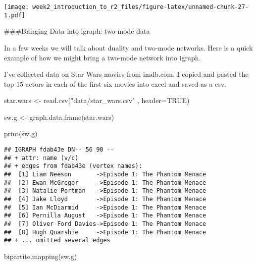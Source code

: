 \documentclass[
]{article}
\newenvironment{Shaded}{\begin{snugshade}}{\end{snugshade}}
\newcommand{\AttributeTok}[1]{\textcolor[rgb]{0.77,0.63,0.00}{#1}}
\newcommand{\ConstantTok}[1]{\textcolor[rgb]{0.00,0.00,0.00}{#1}}
\newcommand{\DecValTok}[1]{\textcolor[rgb]{0.00,0.00,0.81}{#1}}
\newcommand{\FunctionTok}[1]{\textcolor[rgb]{0.00,0.00,0.00}{#1}}
\newcommand{\NormalTok}[1]{#1}
\newcommand{\OtherTok}[1]{\textcolor[rgb]{0.56,0.35,0.01}{#1}}
\newcommand{\SpecialCharTok}[1]{\textcolor[rgb]{0.00,0.00,0.00}{#1}}
\newcommand{\StringTok}[1]{\textcolor[rgb]{0.31,0.60,0.02}{#1}}
\begin{document}
\begin{Shaded}
\end{Shaded}

\texttt{[image: week2\_introduction\_to\_r2\_files/figure-latex/unnamed-chunk-27-1.pdf]}

\#\#\#Bringing Data into igraph: two-mode data

In a few weeks we will talk about duality and two-mode networks. Here is
a quick example of how we might bring a two-mode network into igraph.

I've collected data on Star Wars movies from imdb.com. I copied and
pasted the top 15 actors in each of the first six movies into excel and
saved as a csv.

\begin{Shaded}
\begin{Highlighting}[]
\NormalTok{star.wars }\OtherTok{\textless{}{-}} \FunctionTok{read.csv}\NormalTok{(}\StringTok{"data/star\_wars.csv"}\NormalTok{ , }\AttributeTok{header=}\ConstantTok{TRUE}\NormalTok{)}

\NormalTok{sw.g }\OtherTok{\textless{}{-}} \FunctionTok{graph.data.frame}\NormalTok{(star.wars)}

\FunctionTok{print}\NormalTok{(sw.g)}
\end{Highlighting}
\end{Shaded}

\begin{verbatim}
## IGRAPH fdab43e DN-- 56 90 -- 
## + attr: name (v/c)
## + edges from fdab43e (vertex names):
##  [1] Liam Neeson       ->Episode 1: The Phantom Menace
##  [2] Ewan McGregor     ->Episode 1: The Phantom Menace
##  [3] Natalie Portman   ->Episode 1: The Phantom Menace
##  [4] Jake Lloyd        ->Episode 1: The Phantom Menace
##  [5] Ian McDiarmid     ->Episode 1: The Phantom Menace
##  [6] Pernilla August   ->Episode 1: The Phantom Menace
##  [7] Oliver Ford Davies->Episode 1: The Phantom Menace
##  [8] Hugh Quarshie     ->Episode 1: The Phantom Menace
## + ... omitted several edges
\end{verbatim}

\begin{Shaded}
\begin{Highlighting}[]
\FunctionTok{bipartite.mapping}\NormalTok{(sw.g)}
\end{Highlighting}
\end{Shaded}
\end{document}
